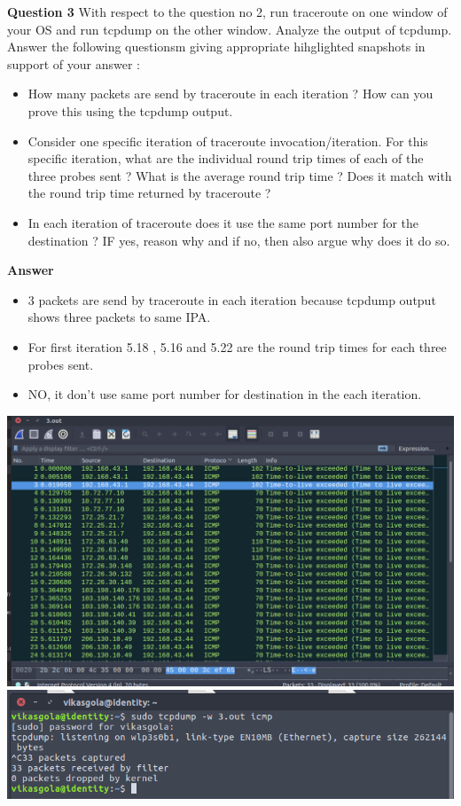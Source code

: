 \documentclass[14pt]{extarticle}
\begin{document}
    \noindent
    \textbf{\large Question 3}
    With respect to the question no 2, run traceroute on one window of your OS and run tcpdump on the
    other window. Analyze the output of tcpdump. Answer the following questionsm giving appropriate
    hihglighted snapshots in support of your answer :
    \begin{itemize}
        \item How many packets are send by traceroute in each iteration ? How can you prove this using the
        tcpdump output.
        \item Consider one specific iteration of traceroute invocation/iteration. For this specific iteration, what
        are the individual round trip times of each of the three probes sent ? What is the average round
        trip time ? Does it match with the round trip time returned by traceroute ?
        \item In each iteration of traceroute does it use the same port number for the destination ? IF yes, reason
        why and if no, then also argue why does it do so.
    \end{itemize}
    \textbf{\large Answer}
    \begin{itemize}
        \item 3 packets are send by traceroute in each iteration because tcpdump output shows three packets to same IPA.
        \item For first iteration 5.18 , 5.16 and 5.22 are the round trip times for each three probes sent.
        \item NO, it don't use same port number for destination in the each iteration.
    \end{itemize}
    \includegraphics[scale=0.3]{3_0}
    \\[10pt]
    \includegraphics[scale=0.6]{3_1}
\end{document}
